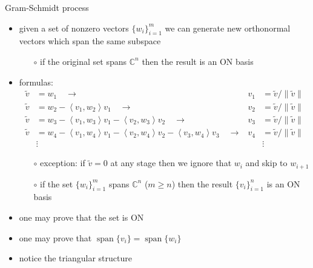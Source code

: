 \documentclass[10pt,hyperref]{beamer}
\newcommand{\CC}{\mathbb{C}}
\newcommand{\ip}[2]{\left<#1,#2\right>}
\begin{document}
\begin{frame}{Gram-Schmidt process}

\begin{itemize}
\item given a set of nonzero vectors $\{w_i\}_{i=1}^m$ we can generate new orthonormal vectors which span the same subspace
    \begin{itemize}
    \item[$\circ$] if the original set spans $\CC^n$ then the result is an ON basis
    \end{itemize}
\item formulas:
\begin{align*}
\tilde v &= w_1 \quad \to & v_1 &= \tilde v/\|\tilde v\| \\
\tilde v &= w_2 - \ip{v_1}{w_2} v_1 \quad \to & v_2 &= \tilde v/\|\tilde v\| \\
\tilde v &= w_3 - \ip{v_1}{w_3} v_1 - \ip{v_2}{w_3} v_2 \quad \to & v_3 &= \tilde v/\|\tilde v\| \\
\tilde v &= w_4 - \ip{v_1}{w_4} v_1 - \ip{v_2}{w_4} v_2 - \ip{v_3}{w_4} v_3 \quad \to & v_4 &= \tilde v/\|\tilde v\| \\
&\vdots & &\vdots
\end{align*}
\vspace{-4mm}
    \begin{itemize}
    \item[$\circ$] exception: if $\tilde v=0$ at any stage then we ignore that $w_i$ and skip to $w_{i+1}$
    \item[$\circ$] if the set $\{w_i\}_{i=1}^m$ spans $\CC^n$ ($m\ge n$) then the result $\{v_i\}_{i=1}^n$ is an ON basis
    \end{itemize}
\item one may prove that the set  is ON
\item one may prove that $\operatorname{span}\{v_i\} = \operatorname{span}\{w_i\}$
\item notice the triangular structure
\end{itemize}
\end{frame}
\end{document}
